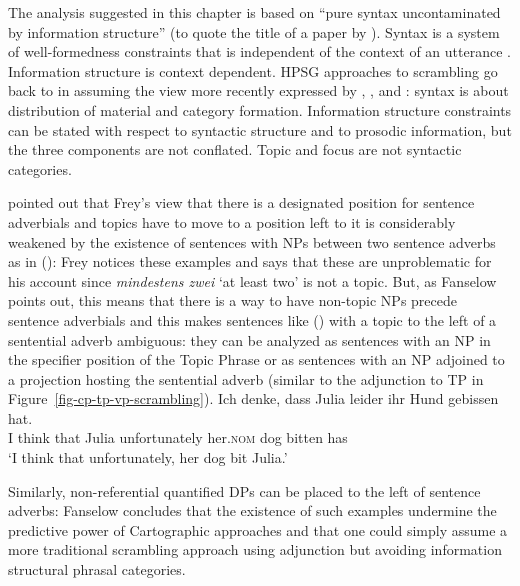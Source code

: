 The analysis suggested in this chapter is based on ``pure syntax uncontaminated by information
structure'' (to quote the title of a paper by \citealt{Fanselow2006a}). Syntax is a system of
well-formedness constraints that is independent of the context of an utterance \citep[]{Fanselow2006a}. Information
structure is context dependent. HPSG approaches to scrambling go back to \citet{Gunji86a} in assuming
the view more recently expressed by \citet{Fanselow2003b,Fanselow2006a}, \citet{NK2008a-u}, \citet[]{Struckmeier2017a} and \citet{Haider2021a}: syntax is
about distribution of material and category formation. Information structure constraints can be
stated with respect to syntactic structure \citep{EV94a,EV96a,DeKuthy2021a} and to prosodic information, but the three components are
not conflated. Topic and focus are not syntactic categories.  


\largerpage
\citet{Fanselow2006a} pointed out that Frey's view that there is a designated
position for sentence adverbials and topics have to move to a position left to it is considerably
weakened by the existence of sentences with NPs between two sentence adverbs as in ():
\ea
{}
\z
Frey notices these examples and says that these are unproblematic for his account since
\emph{mindestens zwei} `at least two' is not a topic. But, as Fanselow points out, this means that there is a way
to have non-topic NPs precede sentence adverbials and this makes sentences like () with a topic to the left of a
sentential adverb ambiguous: they can be analyzed as sentences with an NP in the specifier position
of the Topic Phrase or as sentences with an NP adjoined to a projection hosting the sentential
adverb (similar to the adjunction to TP in Figure~\ref{fig-cp-tp-vp-scrambling}).
\ea
\gll Ich denke, dass Julia leider        ihr Hund gebissen hat.\\
     I   think  that Julia unfortunately her.\textsc{nom} dog bitten has\\\german
\glt `I think that unfortunately, her dog bit Julia.'
\z

\noindent
Similarly, non-referential quantified DPs can be placed to the left of sentence adverbs:
\ea
{}
\z
Fanselow concludes that the existence of such examples undermine the predictive power of
Cartographic approaches and that one could simply assume a more traditional scrambling approach
using adjunction but avoiding information structural phrasal categories.

